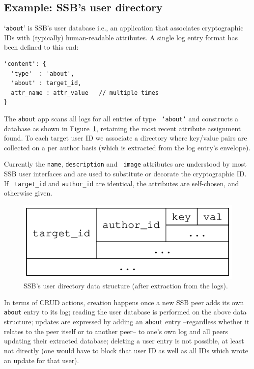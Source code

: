 \documentclass[sigconf]{acmart}
\begin{document}
\subsection{Example: SSB's user directory}

`{\small\tt about}' is SSB's user database i.e., an application that
associates cryptographic IDs with (typically) human-readable
attributes. A single log entry format has been defined to this end:
{\small\begin{verbatim}
'content': {
  'type'  : 'about',
  'about' : target_id,
  attr_name : attr_value   // multiple times
}
\end{verbatim}}

\noindent
The {\small\tt about} app scans all logs for all entries of type {\small\tt
  `about'} and constructs a database as shown in
Figure~\ref{fig:about}, retaining the most recent attribute assignment
found.  To each target user ID we associate a directory where
key/value pairs are collected on a per author basis (which is extracted
from the log entry's envelope).

Currently the {\small\tt name}, {\small\tt description} and {\small\tt
  image} attributes are understood by most SSB user interfaces and are
used to substitute or decorate the cryptographic ID. If {\small\tt
  target\_id} and {\small\tt author\_id} are identical, the
attributes are self-chosen, and otherwise given.

\begin{figure}[htb]
  \includegraphics[width=0.6\columnwidth]{figs/about-ds.pdf}
  \caption{SSB's user directory data structure (after extraction from the logs).}
  \label{fig:about}
\end{figure}

\noindent
In terms of CRUD actions, creation happens once a new SSB peer adds
its own {\small\tt about} entry to its log; reading the user database
is performed on the above data structure; updates are expressed by
adding an {\small\tt about} entry --regardless whether it relates to
the peer itself or to another peer-- to one's own log and all peers
updating their extracted database; deleting a user entry is not
possible, at least not directly (one would have to block that user ID
as well as all IDs which wrote an update for that user).
\end{document}
